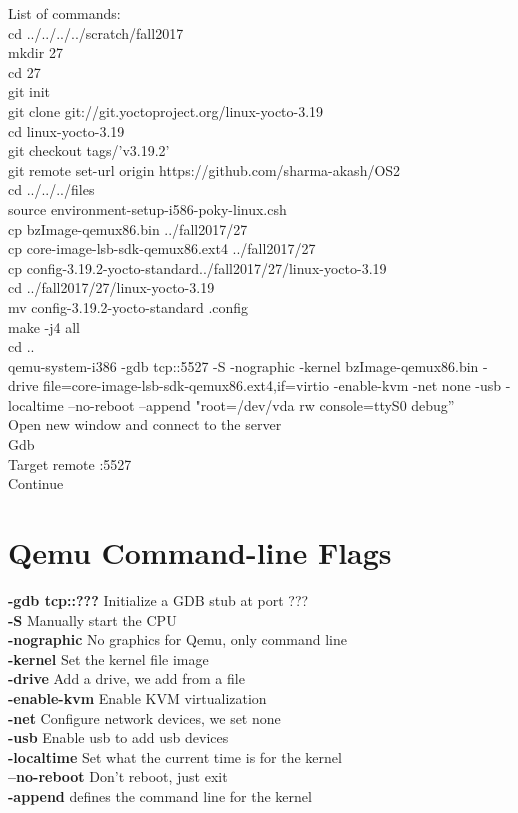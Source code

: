 \documentclass[onecolumn, draftclsnofoot,10pt, compsoc]{IEEEtran}
\begin{document}
	List of commands: \\
	cd ../../../../scratch/fall2017 \\
	mkdir 27 \\
	cd 27 \\
	git init \\
	git clone git://git.yoctoproject.org/linux-yocto-3.19 \\
	cd linux-yocto-3.19 \\
	git checkout tags/’v3.19.2’ \\
	git remote set-url origin https://github.com/sharma-akash/OS2 \\
	cd ../../../files \\
	source environment-setup-i586-poky-linux.csh \\
	cp bzImage-qemux86.bin ../fall2017/27 \\
	cp core-image-lsb-sdk-qemux86.ext4 ../fall2017/27 \\
	cp config-3.19.2-yocto-standard../fall2017/27/linux-yocto-3.19 \\
	cd ../fall2017/27/linux-yocto-3.19 \\
	mv config-3.19.2-yocto-standard .config \\
	make -j4 all \\
	cd .. \\
	qemu-system-i386 -gdb tcp::5527 -S -nographic -kernel bzImage-qemux86.bin
	-drive file=core-image-lsb-sdk-qemux86.ext4,if=virtio -enable-kvm -net none
	-usb -localtime --no-reboot --append "root=/dev/vda rw console=ttyS0 debug” \\
	Open new window and connect to the server \\
	Gdb \\
	Target remote :5527 \\
	Continue \\

\section{Qemu Command-line Flags}

	\textbf{-gdb tcp::???} Initialize a GDB stub at port ??? \\
	\textbf{-S} Manually start the CPU \\
	\textbf{-nographic} No graphics for Qemu, only command line \\
	\textbf{-kernel} Set the kernel file image \\
	\textbf{-drive} Add a drive, we add from a file \\
	\textbf{-enable-kvm} Enable KVM virtualization \\
	\textbf{-net} Configure network devices, we set none \\
	\textbf{-usb} Enable usb to add usb devices \\
	\textbf{-localtime} Set what the current time is for the kernel \\
	\textbf{--no-reboot} Don't reboot, just exit \\
	\textbf{-append} defines the command line for the kernel \\
\end{document}
